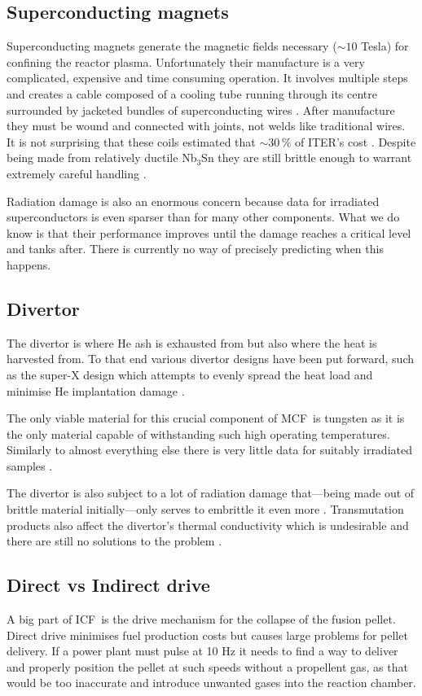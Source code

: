 \documentclass[12pt, a4paper]{article}
\newcommand{\mc}{MCF}
\newcommand{\ic}{ICF}
\newcommand{\ite}{ITER}
\begin{document}
		\subsection{Superconducting magnets}\label{ss:sm}
			Superconducting magnets generate the magnetic fields necessary ($\sim 10$ Tesla) for confining the reactor plasma. Unfortunately their manufacture is a very complicated, expensive and time consuming operation. It involves multiple steps and creates a cable composed of a cooling tube running through its centre surrounded by jacketed bundles of superconducting wires \cite{sm1}. After manufacture they must be wound and connected with joints, not welds like traditional wires. It is not surprising that these coils estimated that $\sim 30\, \%$ of \ite's cost \cite{cost}. Despite being made from relatively ductile Nb$_{3}$Sn they are still brittle enough to warrant extremely careful handling \cite{sm2}.
			
			Radiation damage is also an enormous concern because data for irradiated superconductors is even sparser than for many other components. What we do know is that their performance improves until the damage reaches a critical level and tanks after. There is currently no way of precisely predicting when this happens.
		\subsection{Divertor}\label{ss:div}
			The divertor is where He ash is exhausted from but also where the heat is harvested from. To that end various divertor designs have been put forward, such as the super-X design which attempts to evenly spread the heat load and minimise He implantation damage \cite{div1}.
			
			The only viable material for this crucial component of \mc~is tungsten as it is the only material capable of withstanding such high operating temperatures. Similarly to almost everything else there is very little data for suitably irradiated samples \cite{div2}.
			
			The divertor is also subject to a lot of radiation damage that---being made out of brittle material initially---only serves to embrittle it even more \cite{div3}. Transmutation products also affect the divertor's thermal conductivity which is undesirable and there are still no solutions to the problem \cite{div4}.
		\subsection{Direct vs Indirect drive}\label{ss:drv}
			A big part of \ic~is the drive mechanism for the collapse of the fusion pellet. Direct drive minimises fuel production costs but causes large problems for pellet delivery. If a power plant must pulse at 10 Hz it needs to find a way to deliver and properly position the pellet at such speeds without a propellent gas, as that would be too inaccurate and introduce unwanted gases into the reaction chamber. 
			
\end{document}
